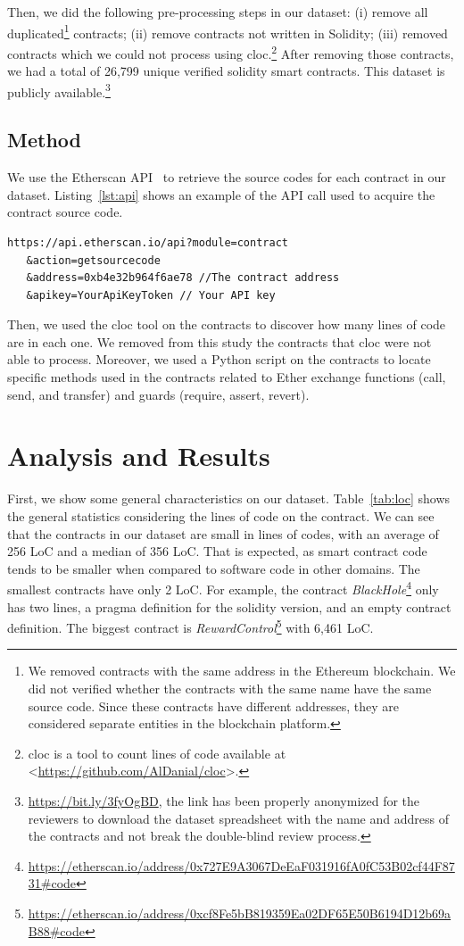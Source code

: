 \documentclass[10pt,conference]{IEEEtran}
\newcommand{\totalContracts}{26,799\xspace}
\begin{document}
Then, we did the following pre-processing steps in our dataset: (i) remove all duplicated\footnote{We removed contracts with the same address in the Ethereum blockchain. We did not verified whether the contracts with the same name have the same source code. Since these contracts have different addresses, they are considered separate entities in the blockchain platform.} contracts; (ii) remove contracts not written in Solidity; (iii) removed contracts which we could not process using cloc.\footnote{cloc is a tool to count lines of code available at <\url{https://github.com/AlDanial/cloc}>.} After removing those contracts, we had a total of \totalContracts unique verified solidity smart contracts. This dataset is publicly available.\footnote{\url{https://bit.ly/3fyOgBD}, the link has been properly anonymized for the reviewers to download the dataset spreadsheet with the name and address of the contracts and not break the double-blind review process.} 


\subsection{Method}

We use the Etherscan API~\cite{etherscan_api} to retrieve the source codes for each contract in our dataset. Listing~\ref{lst:api} shows an example of the API call used to acquire the contract source code. 
\begin{lstlisting}[language=solidity, caption=Etherscan API call, label={lst:api}]
https://api.etherscan.io/api?module=contract
   &action=getsourcecode
   &address=0xb4e32b964f6ae78 //The contract address
   &apikey=YourApiKeyToken // Your API key
\end{lstlisting}

Then, we used the cloc tool on the contracts to discover how many lines of code are in each one.  We removed from this study the contracts that cloc were not able to process. Moreover, we used a Python script on the contracts to locate specific methods used in the contracts related to Ether exchange functions (call, send, and transfer) and guards (require, assert, revert).

\section{Analysis and Results}

First, we show some general characteristics on our dataset.
Table~\ref{tab:loc} shows the general statistics considering the lines of code on the contract. We can see that the contracts in our dataset are small in lines of codes, with an average of 256 LoC and a median of 356 LoC. That is expected, as smart contract code tends to be smaller when compared to software code in other domains.  The smallest contracts have only 2 LoC.  For example, the contract \textit{BlackHole}\footnote{\url{https://etherscan.io/address/0x727E9A3067DeEaF031916fA0fC53B02cf44F8731\#code}} only has two lines, a pragma definition for the solidity version, and an empty contract definition. The biggest contract is \textit{RewardControl}\footnote{\url{https://etherscan.io/address/0xcf8Fe5bB819359Ea02DF65E50B6194D12b69aB88\#code}} with 6,461 LoC. 
\end{document}
